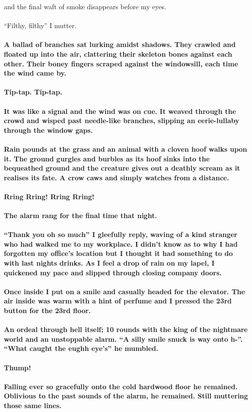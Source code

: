 \documentclass{book}
\begin{document}
{{and the final waft of smoke disappears before my eyes.\\\\``Filthy, filthy'' I mutter.}}


\paragraph{A ballad of branches sat lurking amidst shadows.
They crawled and floated up into the air, clattering their skeleton bones against each other.
Their boney fingers scraped against the windowsill, each time the wind came by.
\\\\Tip-tap. Tip-tap.
\\\\It was like a signal and the wind was on cue.
It weaved through the crowd and wisped past needle-like branches, slipping an eerie-lullaby through the window gaps.
\\\\Rain pounds at the grass and an animal with a cloven hoof walks upon it.
The ground gurgles and burbles as its hoof sinks into the bequeathed ground and the creature gives out a deathly scream as it realises its fate. A crow caws and simply watches from a distance.
\\\\Rring Rring! Rring Rring!
\\\\The alarm rang for the final time that night.}
\paragraph{``Thank you oh so much'' I gleefully reply, waving of a kind stranger who had walked me to my workplace. I didn't know as to why I had forgotten my office's location but I thought it had something to do with last nights drinks. As I feel a drop of rain on my lapel, I quickened my pace and slipped through closing company doors.
\\\\Once inside I put on a smile and casually headed for the elevator. The air inside was warm with a hint of perfume and I pressed the 23rd button for the 23rd floor.
}

\paragraph{
An ordeal through hell itself; 10 rounds with the king of the nightmare world and an unstoppable alarm.
``A silly smile snuck is way onto h-''.
``What caught the eughh eye's'' he mumbled.\\\\Thump!\\\\Falling ever so gracefully onto the cold hardwood floor he remained. Oblivious to the past sounds of the alarm, he remained. Still muttering those same lines.}
\end{document}
